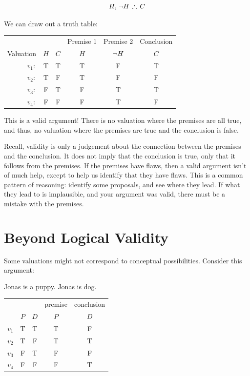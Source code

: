 $$H,\,\enot H\,\therefore\, C$$

We can draw out a truth table: 
\begin{center}
	\begin{tabular}{r c c | c | c | c}
		&&& Premise 1 & Premise 2 & Conclusion\\
		Valuation& $H$ & $C$ & $H$ & $\neg H$ & $C$\\[.3em]
		\hline
		$v_1:$ & T & T & T & F & T\\
		$v_2:$ & T & F & T & F & F\\
		$v_3:$ & F & T & F & T & T\\
		$v_4:$ & F & F & F & T & F\\
	\end{tabular}
\end{center}
This is a valid argument! There is no valuation where the premises are all true, and thus, no valuation where the premises are true and the conclusion is false. 

Recall, validity is only a judgement about the connection between the premises and the conclusion. It does not imply that the conclusion is true, only that it follows from the premises. If the premises have flaws, then a valid argument isn't of much help, except to help us identify that they have flaws. This is a common pattern of reasoning: identify some proposals, and see where they lead. If what they lead to is implausible, and your argument was valid, there must be a mistake with the premises. 


\section{Beyond Logical Validity}


Some valuations might not correspond to conceptual possibilities. 
Consider this argument: 
\begin{earg}
\prem Jonas is a puppy.
\conc Jonas is dog.
\end{earg}

\begin{center}
	\begin{tabular}{rcc|c|c}
		&&&premise&conclusion\\
		&$P$&$D$&$P$&$D$\\\hline
		$v_1$&T&T&T&F\\
		$v_2$&T&F&T&T\\
		$v_3$&F&T&F&F\\
		$v_4$&F&F&F&T\\
	\end{tabular}
\end{center}

